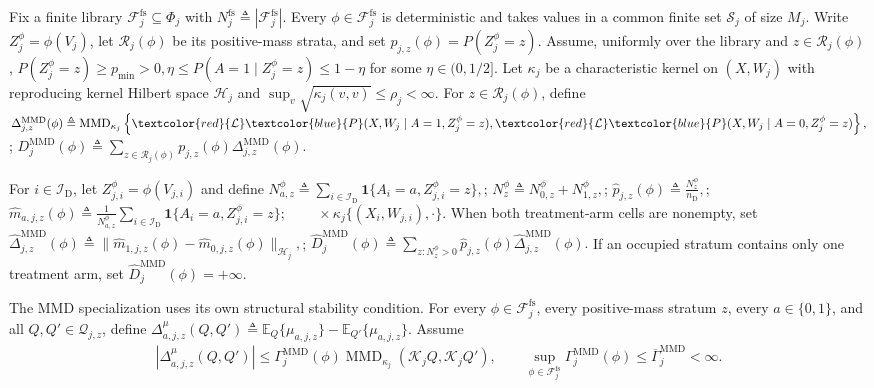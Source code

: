 Fix a finite library $\mathcal F_j^{\mathrm{fs}}\subseteq\Phi_j$ with $N_j^{\mathrm{fs}}\triangleq|\mathcal F_j^{\mathrm{fs}}|$. Every $\phi\in\mathcal F_j^{\mathrm{fs}}$ is deterministic and takes values in a common finite set $\mathcal S_j$ of size $M_j$. Write $Z_j^\phi=\phi(V_j)$, let $\mathcal R_j(\phi)$ be its positive-mass strata, and set $p_{j,z}(\phi)=P(Z_j^\phi=z)$. Assume, uniformly over the library and $z\in\mathcal R_j(\phi)$,
\(P(Z_j^\phi=z)\ge p_{\min}>0, \eta\le P(A=1\mid Z_j^\phi=z)\le1-\eta\)
for some $\eta\in(0,1/2]$. Let $\kappa_j$ be a characteristic kernel on $(X,W_j)$ with reproducing kernel Hilbert space $\mathcal H_j$ and
\(\sup_v\sqrt{\kappa_j(v,v)}\le\rho_j<\infty.\)
For $z\in\mathcal R_j(\phi)$, define
\(\Delta_{j,z}^{\mathrm{MMD}}(\phi) \triangleq \operatorname{MMD}_{\kappa_j} \left\{ \textcolor{red}{\mathcal L}\textcolor{blue}{P}(X,W_j\mid A=1,Z_j^\phi=z), \textcolor{red}{\mathcal L}\textcolor{blue}{P}(X,W_j\mid A=0,Z_j^\phi=z) \right\},\); \(D_j^{\mathrm{MMD}}(\phi) \triangleq \sum_{z\in\mathcal R_j(\phi)} p_{j,z}(\phi)\Delta_{j,z}^{\mathrm{MMD}}(\phi).\)

For $i\in\mathcal I_{\mathrm D}$, let $Z_{j,i}^\phi=\phi(V_{j,i})$ and define
\(N_{a,z}^\phi \triangleq \sum_{i\in\mathcal I_{\mathrm D}} \mathbf 1\{A_i=a,Z_{j,i}^\phi=z\},\); \(N_z^\phi\triangleq N_{0,z}^\phi+N_{1,z}^\phi,\); \(\widehat p_{j,z}(\phi)\triangleq\frac{N_z^\phi}{n_{\mathrm D}},\); \(\widehat m_{a,j,z}(\phi) \triangleq \frac{1}{N_{a,z}^\phi} \sum_{i\in\mathcal I_{\mathrm D}} \mathbf 1\{A_i=a,Z_{j,i}^\phi=z\}\); \(\qquad{} \times\kappa_j\{(X_i,W_{j,i}),\cdot\}.\)
When both treatment-arm cells are nonempty, set
\(\widehat\Delta_{j,z}^{\mathrm{MMD}}(\phi) \triangleq \|\widehat m_{1,j,z}(\phi)-\widehat m_{0,j,z}(\phi)\|_{\mathcal H_j},\); \(\widehat D_j^{\mathrm{MMD}}(\phi) \triangleq \sum_{z:N_z^\phi>0} \widehat p_{j,z}(\phi)\widehat\Delta_{j,z}^{\mathrm{MMD}}(\phi).\)
If an occupied stratum contains only one treatment arm, set $\widehat D_j^{\mathrm{MMD}}(\phi)=+\infty$.

The MMD specialization uses its own structural stability condition. For every $\phi\in\mathcal F_j^{\mathrm{fs}}$, every positive-mass stratum $z$, every $a\in\{0,1\}$, and all $Q,Q'\in\mathcal Q_{j,z}$, define
\(\Delta^\mu_{a,j,z}(Q,Q') \triangleq \mathbb E_Q\{\mu_{a,j,z}\}-\mathbb E_{Q'}\{\mu_{a,j,z}\}.\)
Assume
\begin{align}
\left|\Delta^\mu_{a,j,z}(Q,Q')\right|
\le
\Gamma_j^{\mathrm{MMD}}(\phi)
\operatorname{MMD}_{\kappa_j}(\mathcal K_jQ,\mathcal K_jQ'),
\qquad
\sup_{\phi\in\mathcal F_j^{\mathrm{fs}}}
\Gamma_j^{\mathrm{MMD}}(\phi)
\le\overline\Gamma_j^{\mathrm{MMD}}<\infty.
\label{eq:finite-mmd-stability}
\end{align}

